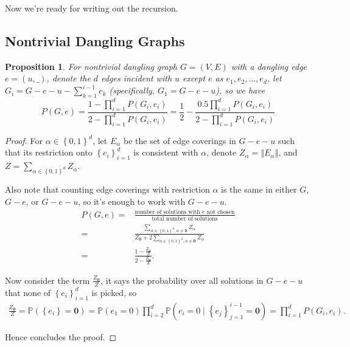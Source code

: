 \documentclass[a4paper]{article}
\newtheorem{Prop}[Thm]{Proposition}
\newcommand{\norm}[1]{\left\Vert#1\right\Vert}
\newcommand{\set}[1]{\left\{#1\right\}}
\begin{document}
Now we're ready for writing out the recursion.
\subsection{Nontrivial Dangling Graphs}
\begin{Prop}
For nontrivial dangling graph $G=(V,E)$ with a dangling edge $e=(u,\_)$, denote the $d$ %
edges incident with $u$ except $e$ as $e_1, e_2, \ldots, e_d$,
let $G_i = G - e - u - \sum_{k=1}^{i-1} e_k$ (specifically, $G_1 = G - e - u$), so we have%
	\begin{equation}
		P(G, e) = \frac{1-\prod_{i=1}^d P(G_i, e_i)}{2 - \prod_{i=1}^d P(G_i, e_i)} = \frac{1}{2} - \frac{0.5 \prod_{i=1}^d P(G_i, e_i)}{2 - \prod_{i=1}^d P(G_i, e_i)}
		\label{propp3rg}
	\end{equation}
\end{Prop}
\begin{proof}
	For $\alpha \in \set{0,1}^d$, let $E_{\alpha}$ be the set of edge coverings in $G-e-u$ such that its restriction onto $\set{e_i}_{i=1}^{d}$ is consistent with $\alpha$, denote $Z_{\alpha} = \norm{E_{\alpha}}$, and $Z = \sum_{\alpha \in \set{0,1}^d} Z_{\alpha}$. %

		Also note that counting edge coverings with restriction $\alpha$ is the same in either $G$, $G-e$, or $G-e-u$, so it's enough to work with $G-e-u$.
	\begin{align*}
		P(G,e) = & \frac{\textrm{number of solutions with $e$ not chosen}}{\textrm{total number of solutions}} \\
		=& \frac{\sum_{\alpha \in \set{0,1}^d, \alpha \neq \mathbf{0}} Z_{\alpha} }{ Z_{\mathbf{0}} + 2 \sum_{\alpha \in \set{0,1}^d, \alpha \neq \mathbf{0}} Z_{\alpha}} \\
		=& \frac{1 - \frac{Z_{\mathbf{0}}}{Z}}{ 2 - \frac{Z_{\mathbf{0}}}{Z}}.
	\end{align*}

	Now consider the term $\frac{Z_{\mathbf{0}}}{Z}$, it says the probability over all solutions in $G-e-u$ that none of $\set{e_i}_{i=1}^{d}$ is picked, so
	\begin{align*}
		\frac{Z_{\mathbf{0}}}{Z}=\mathbb{P} \left( \set{e_i} = \mathbf{0}\right) = \mathbb{P} (e_1 = 0) \prod_{i=2}^d \mathbb{P} \left(e_i = 0 \mid \set{e_j}_{j=1}^{i-1} = \mathbf{0}\right) = \prod_{i=1}^d P(G_i, e_i).
	\end{align*}

	Hence concludes the proof.
	
\end{proof}
\end{document}
